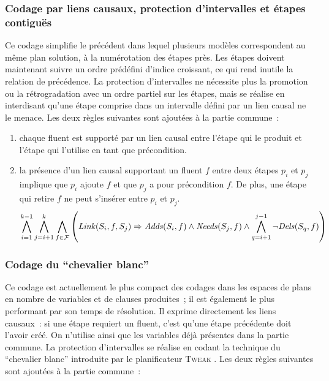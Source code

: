 {\subsubsection{Codage par liens causaux, protection d'intervalles et étapes contiguës}

Ce codage simplifie le précédent dans lequel plusieurs modèles correspondent au
même plan solution, à la numérotation des étapes près. Les étapes doivent
maintenant suivre un ordre prédéfini d'indice croissant, ce qui rend inutile la
relation de précédence. La protection d'intervalles ne nécessite plus la
promotion ou la rétrogradation avec un ordre partiel sur les étapes, mais se
réalise en interdisant qu'une étape comprise dans un intervalle défini par un
lien causal ne le menace. Les deux règles suivantes sont ajoutées à la partie
commune~:

\begin{enumerate}
\item {} chaque fluent est supporté par un
  lien causal entre l'étape qui le produit et l'étape qui l'utilise en tant que
  précondition.
\item {} la présence d'un lien
  causal supportant un fluent $f$ entre deux étapes $p_i$ et $p_j$
  implique que $p_i$ ajoute $f$ et que $p_j$ a pour précondition
  $f$. De plus, une étape qui retire $f$ ne peut s'insérer entre $p_i$ et
  $p_j$.
\[
\BigforallTwo{i=1}{k-1} \BigforallTwo{j=i+1}{k} \Bigforall{\f\in \F} \left( %
  \Linksteps{i}{\f}{j} \Rightarrow \Adds{i}{\f} \land \Needs{j}{\f} \land %
  \BigforallTwo{q=i+1}{j-1} \lnot \Dels{q}{\f}%
  \right)
\]
\end{enumerate}

\subsubsection{Codage du \enquote{chevalier blanc}}

Ce codage est actuellement le plus compact des codages dans les espaces de plans
en nombre de variables et de clauses produites~; il est également le plus
performant par son temps de résolution. Il exprime directement les liens
causaux~: si une étape requiert un fluent, c'est qu'une étape précédente doit
l'avoir créé. On n'utilise ainsi que les variables déjà présentes dans la partie
commune. La protection d'intervalles se réalise en codant la technique du
\enquote{chevalier blanc} introduite par le planificateur \textsc{Tweak}
\cite{Cha87}. Les deux règles suivantes sont ajoutées à la partie commune~:


}
